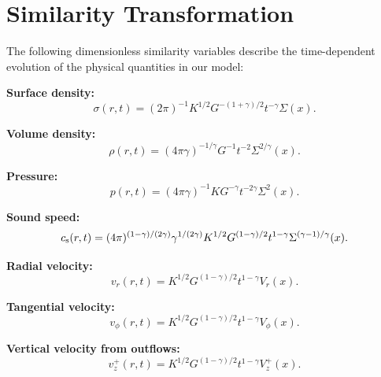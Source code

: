 \documentclass[twocolumn,linenumbers]{aastex631}
\begin{document}





\appendix

\section{Similarity Transformation} \label{app1}

The following dimensionless similarity variables describe the time-dependent evolution of the physical quantities in our model:

\textbf{Surface density:}
\begin{equation}
\sigma(r,t) = (2\pi)^{-1} K^{1/2} G^{-(1+\gamma)/2} t^{-\gamma} \Sigma(x).
\end{equation}

\textbf{Volume density:}
\begin{equation}
\rho(r,t) = (4\pi\gamma)^{-1/\gamma} G^{-1} t^{-2} \Sigma^{2/\gamma}(x).
\end{equation}

\textbf{Pressure:}
\begin{equation}
p(r,t) = (4\pi\gamma)^{-1} K G^{-\gamma} t^{-2\gamma} \Sigma^2(x).
\end{equation}

\textbf{Sound speed:}
\begin{equation}
c_{\rm s}(r,t) = (4\pi)^{(1-\gamma)/(2\gamma)} \gamma^{1/(2\gamma)} K^{1/2} G^{(1-\gamma)/2} t^{1-\gamma} \Sigma^{(\gamma-1)/\gamma}(x).
\end{equation}

\textbf{Radial velocity:}
\begin{equation}
v_{r}(r,t) = K^{1/2} G^{(1-\gamma)/2} t^{1-\gamma} V_{r}(x).
\end{equation}

\textbf{Tangential velocity:}
\begin{equation}
v_{\phi}(r,t) = K^{1/2} G^{(1-\gamma)/2} t^{1-\gamma} V_{\phi}(x).
\end{equation}

\textbf{Vertical velocity from outflows:}
\begin{equation}
v_{z}^{+}(r,t) = K^{1/2} G^{(1-\gamma)/2} t^{1-\gamma} V_{z}^{+}(x).
\end{equation}
\end{document}

